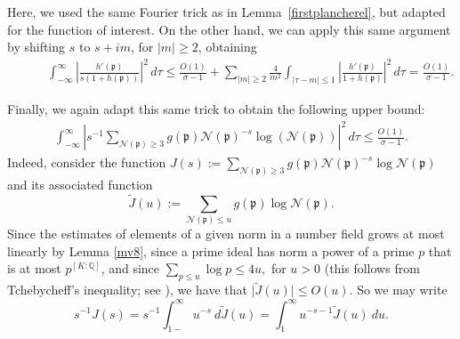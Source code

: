 \documentclass[11pt]{amsart}
\theoremstyle{definition}
\newcommand{\NN}{{\mathcal N}}
\newcommand{\Q}{{\mathbb Q}}
\newcommand{\mf}{\mathfrak}
\begin{document}
   Here, we used the same Fourier trick as in Lemma~\ref{firstplancherel}, but adapted for the function of interest. %
   On the other hand, we can apply this same argument by shifting $s$ to $s+im$, for $|m| \geq 2$, obtaining
    \begin{equation}\nonumber
    \begin{split}
      &\qquad \int_{-\infty}^{\infty}\left|\frac{h'(\mf p)}{s(1+h(\mf p))}\right|^{2}\,d\tau
       \leq \frac{O(1)}{\sigma-1}+\sum_{\vert m\vert\geq 2}\frac{4}{m^{2}}\int_{\vert\tau-m\vert\leq 1}\left|\frac{h'(\mf p)}{1+h(\mf p)}\right|^{2}\,d\tau=\frac{O(1)}{\sigma-1}.
    \end{split}
 \end{equation} 
 
 Finally, we again adapt this same trick to obtain the following upper bound:
  \begin{equation}\label{Jplanchereltrick}
    \begin{split}
       \int_{-\infty}^{\infty}\left| s^{-1}\sum_{\NN(\mf p)\geq 3}g(\mf p)\NN(\mf p)^{-s}\log(\NN(\mf p))\right|^{2}\,d\tau
       \leq \frac{O(1)}{\sigma-1}.
    \end{split}
 \end{equation} 
 Indeed, consider the function $J(s):=\sum_{\NN(\mf p) \geq 3} g(\mf p)\NN(\mf p)^{-s} \log \NN(\mf p)$ and its associated function
 \[
 \tilde{J}(u):=\sum_{\NN(\mf p) \leq u} g(\mf p)\log \NN( \mf p).
 \]
Since the estimates of elements of a given norm in a number field grows at most linearly by Lemma \ref{mv8}, since a prime ideal has norm a power of a prime $p$ that is at most $p^{[K: \Q]}$, and since $\sum_{p \leq u} \log p \leq 4u,$ for $u>0$ (this follows from Tchebycheff's inequality; see \cite[p. 235]{E79book}), we have that $\vert\tilde{J}(u)\vert\leq O(u)$.
So we may write
 \begin{equation}\label{early2}
s^{-1}J(s)=s^{-1}\int_{1-}^{\infty} u^{-s} \ d\tilde{J}(u)=\int_{1}^{\infty} u^{-s-1} \tilde{J}(u) \ du.
 \end{equation}
 
\end{document}
